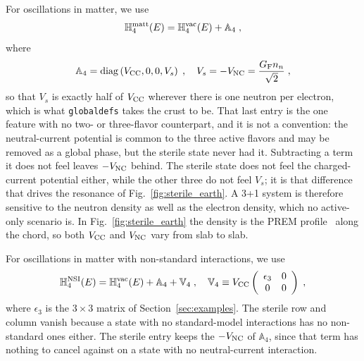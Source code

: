 \documentclass[final,5p,times,twocolumn,sort,compress]{elsarticle}
\newcommand{\fig}{Fig.}
\newcommand{\figu}[1]{\fig~\ref{fig:#1}}
\begin{document}
For oscillations in matter, we use
\begin{equation}
 \mathbb{H}_4^{\rm matt}(E)
 =
 \mathbb{H}_4^{\rm vac}(E) + \mathbb{A}_4 \;,
\end{equation}
where
\begin{equation}
 \label{equ:a4}
 \mathbb{A}_4 = {\rm diag}\left(V_{\rm CC}, 0, 0, V_s\right) \;,
 \quad
 V_s = -V_{\rm NC} = \frac{G_{\rm F} n_n}{\sqrt{2}} \;,
\end{equation}
so that $V_s$ is exactly half of $V_{\rm CC}$ wherever there is one neutron per electron, which is what {\tt globaldefs} takes the crust to be.  That last entry is the one feature with no two- or three-flavor counterpart, and it is not a convention: the neutral-current potential is common to the three active flavors and may be removed as a global phase, but the sterile state never had it.  Subtracting a term it does not feel leaves $-V_{\rm NC}$ behind.  The sterile state does not feel the charged-current potential either, while the other three do not feel $V_s$; it is that difference that drives the resonance of \figu{sterile_earth}.  A 3+1 system is therefore sensitive to the neutron density as well as the electron density, which no active-only scenario is.  In \figu{sterile_earth} the density is the PREM profile\ \cite{Dziewonski:1981xy} along the chord, so both $V_{\rm CC}$ and $V_{\rm NC}$ vary from slab to slab.

For oscillations in matter with non-standard interactions, we use
\begin{equation}
 \mathbb{H}_4^{\rm NSI}(E)
 =
 \mathbb{H}_4^{\rm vac}(E) + \mathbb{A}_4 + \mathbb{V}_4 \;,
 \quad
 \mathbb{V}_4 \equiv V_{\rm CC}
 \left(
  \begin{array}{cc}
   \epsilon_3 & 0 \\
   0          & 0 \\
  \end{array}
 \right) \;,
\end{equation}
where $\epsilon_3$ is the $3 \times 3$ matrix of Section\ \ref{sec:examples}.  The sterile row and column vanish because a state with no standard-model interactions has no non-standard ones either.  The sterile entry keeps the $-V_{\rm NC}$ of $\mathbb{A}_4$, since that term has nothing to cancel against on a state with no neutral-current interaction.
\end{document}
